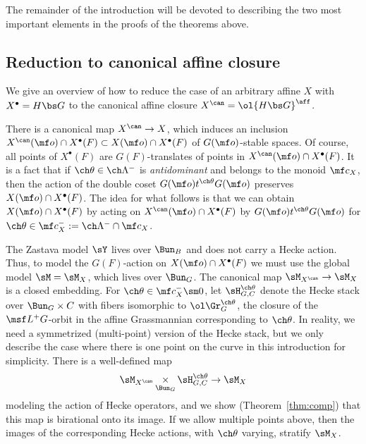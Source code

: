 \documentclass[final]{amsart}
\theoremstyle{remark}
\theoremstyle{definition}
\DeclareMathOperator*{\xt}{\times}
\numberwithin{equation}{section}
\begin{document}
The remainder of the introduction will be devoted to describing the two most important elements in the proofs of the theorems above.


\subsection{Reduction to canonical affine closure}
\label{subsection-reduction-affineclosure}

We give an overview of how to reduce the case of an arbitrary affine $X$ with 
$X^\bullet=H\bs G$ to the 
canonical affine closure $X^\can = \ol{H\bs G}^\aff$.  

There is a canonical map $X^\can \to X$, which induces an inclusion 
$X^\can(\mf o) \cap X^\bullet(F) \subset X(\mf o)\cap X^\bullet(F)$ of 
$G(\mf o)$-stable spaces.
Of course, all points of $X^\bullet(F)$ are $G(F)$-translates of points in $X^\can(\mf o)\cap X^\bullet(F)$. 
It is a fact that if $\ch\theta \in \ch\Lambda^-$ is \emph{antidominant} 
and belongs to the monoid $\mf c_X$, then 
the action of the double coset $G(\mf o) t^{\ch\theta} G(\mf o)$ preserves $X(\mf o)\cap X^\bullet(F)$. 
The idea for what follows is that we can obtain 
$X(\mf o)\cap X^\bullet(F)$ by acting on $X^\can(\mf o)\cap X^\bullet(F)$ by $G(\mf o) t^{\ch\theta} G(\mf o)$
for $\ch\theta \in \mf c_X^- := \ch\Lambda^- \cap \mf c_X$.  

The Zastava model $\sY$ lives over $\Bun_B$ and does not carry a Hecke action. 
Thus, to model the $G(F)$-action on $X(\mf o)\cap X^\bullet(F)$ we must use the global model
$\sM=\sM_X$, which lives over $\Bun_G$. 
The canonical map $\sM_{X^\can} \to \sM_X$ is a closed embedding. 
For $\ch\theta \in \mf c_X^-\sm 0$, %
 let $\sH^{\ch\theta}_{G,C}$ denote the Hecke stack 
over $\Bun_G \times C$ with fibers isomorphic to $\ol\Gr_G^{\ch\theta}$, the closure
of the $\msf L^+G$-orbit in the affine Grassmannian corresponding to $\ch\theta$.  
In reality, we need a symmetrized (multi-point) version of the Hecke stack, but we only describe
the case where there is one point on the curve in this introduction for simplicity. 
There is a well-defined map 
\begin{equation}
 \label{e:Heckeaction}
\sM_{X^\can} \xt_{\Bun_G} \sH_{G,C}^{\ch\theta} \to \sM_X 
\end{equation}
modeling the action of Hecke operators, and we show (Theorem~\ref{thm:comp}) that this map is birational onto its image. 
If we allow multiple points above, then the images of the corresponding Hecke actions, with $\ch\theta$ varying, 
stratify $\sM_X$. 
\end{document}
